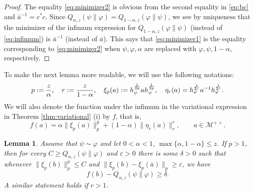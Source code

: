 \documentclass[12pt]{article}
\newtheorem{lemma}[theorem]{Lemma}
\theoremstyle{definition}
\theoremstyle{remark}
\numberwithin{equation}{section}
\def\Me{\mathcal M}
\def\ffi{\varphi}
\def\eps{\varepsilon}
\begin{document}
\begin{proof}
The equality  \eqref{eq:minimizer2} is obvious from the second equality in \eqref{eq:bc} and $\bar a^{-1}=c^*c$. Since
$Q_{\alpha,z}(\psi\|\ffi)=Q_{1-\alpha,z}(\ffi\|\psi)$, we see by uniqueness that the minimizer of the
infimum expression for $Q_{1-\alpha,z}(\ffi\|\psi)$ (instead of \eqref{eq:infimum}) is
$\bar a^{-1}$ (instead of $\bar a$). This
says that \eqref{eq:minimizer1} is the equality corresponding to \eqref{eq:minimizer2} when $\psi,\ffi,\alpha$ are replaced with
$\ffi,\psi,1-\alpha$, respectively. 



\end{proof}

To make the  next lemma more readable, we will use the following notations:
\[
p:={z\over\alpha},\quad r:={z\over 1-\alpha},\quad  \xi_p(a):=h_\psi^{1\over
2p}ah_\psi^{1\over 2p},\quad \eta_r(a)=h_\ffi^{1\over
2r}a^{-1}h_\ffi^{1\over 2r}.
\]
We will also denote the function under the infimum in the variational expression in
Theorem \ref{thm:variational} (i) by $f$, that is,
\[
f(a)=\alpha\|\xi_p(a)\|_p^p
+(1-\alpha)\|\eta_r(a)\|_r^r,\qquad a\in \Me^{++}.
\]



\begin{lemma}\label{lemma:variational_majorized2} Assume that $\psi\sim\ffi$  and let $0<\alpha<1$,
$\max\{\alpha,1-\alpha\}\le z$. If $p>1$, then for every $C\ge Q_{\alpha,z}(\psi\|\ffi)$ and $\eps>0$ there is
some $\delta>0$ such that whenever $\|\xi_p(b)\|^p_p\le C$ and $\|\xi_p(b)-\xi_p(\bar
a)\|_p\ge \eps$, we have
\[
f(b)-Q_{\alpha,z}(\psi\|\ffi)\ge \delta.
\]
A similar statement holds if $r>1$.

\end{lemma}
\end{document}
